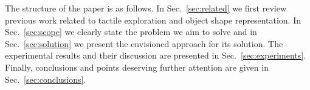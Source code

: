 The structure of the paper is as follows. In Sec.~\ref{sec:related} we first review previous work related to tactile exploration and object shape representation. In Sec.~\ref{sec:scope} we clearly state the problem we aim to solve and in Sec.~\ref{sec:solution} we present the envisioned approach for its solution. The experimental results and their discussion are presented in Sec.~\ref{sec:experiments}. Finally, conclusions and points deserving further attention are given in Sec.~\ref{sec:conclusions}.










